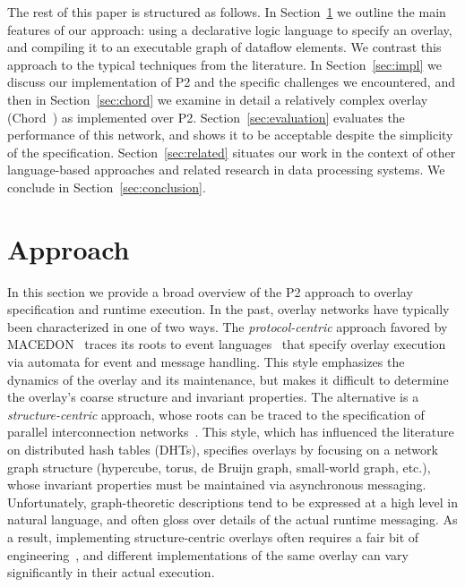 \documentclass{sig-alt-full}
\def\Sys{P2\xspace}
\begin{document}
The rest of this paper is structured as follows.  In
Section~\ref{sec:approach} we outline the main features of our
approach: using a declarative logic language to specify an overlay,
and compiling it to an executable graph of
dataflow elements.  We contrast this approach to the typical
techniques from the literature.  In Section~\ref{sec:impl} we discuss our implementation of
\Sys and the specific challenges we encountered, and then in
Section~\ref{sec:chord} we examine in detail a relatively complex
overlay (Chord~\cite{chord}) as implemented over \Sys. 
Section~\ref{sec:evaluation} evaluates the performance of this network,
and shows it to be acceptable despite the simplicity
of the specification.  Section~\ref{sec:related} situates our work in
the context of other language-based approaches and related research in
data processing systems.  We conclude in
Section~\ref{sec:conclusion}. 

\section{Approach}
\label{sec:approach}
In this section we provide a broad overview of the \Sys approach to
overlay specification and runtime execution.  In the past, overlay
networks have
typically been characterized in one of two ways.  The {\em
  protocol-centric} approach favored by MACEDON~\cite{rodriguez04macedon} traces
  its roots to event 
  languages~\cite{estelle-success,fdt-book} that
specify overlay execution via automata for event and
message handling.  This style emphasizes the dynamics of the overlay
and its maintenance, but makes it difficult to determine the overlay's
coarse structure and invariant properties.  The alternative is a {\em
  structure-centric} approach, whose roots can be traced to the
  specification of parallel interconnection
  networks~\cite{leighton-book}.  This style, which has influenced
the literature on distributed hash tables (DHTs),  specifies overlays
by focusing on a network graph structure (hypercube, torus, de Bruijn
graph, small-world graph, etc.), whose invariant properties must be 
maintained via asynchronous messaging.  Unfortunately, graph-theoretic
descriptions tend to be expressed at a high level in natural language,
and often gloss over details of the actual
runtime messaging.  As a
result, implementing structure-centric overlays often requires a fair
bit of engineering~\cite{rhea_usenix_2004,dabek_nsdi04}, and different implementations of the same overlay can vary significantly in
their actual execution.
\end{document}

